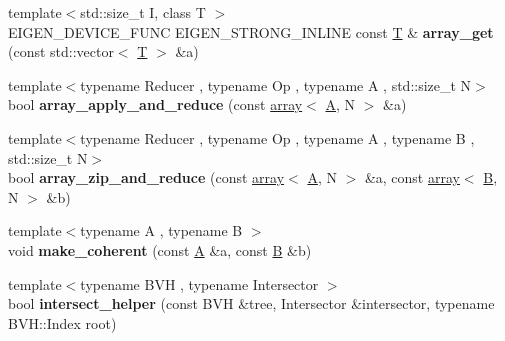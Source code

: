 \begin{DoxyCompactItemize}
\item 
\mbox{\label{namespace_eigen_1_1internal_a3e49b17b66fa573ff6b9d9855f22a997}} 
{\footnotesize template$<$std\+::size\+\_\+t I, class T $>$ }\\E\+I\+G\+E\+N\+\_\+\+D\+E\+V\+I\+C\+E\+\_\+\+F\+U\+NC E\+I\+G\+E\+N\+\_\+\+S\+T\+R\+O\+N\+G\+\_\+\+I\+N\+L\+I\+NE const \hyperlink{group___sparse_core___module}{T} \& {\bfseries array\+\_\+get} (const std\+::vector$<$ \hyperlink{group___sparse_core___module}{T} $>$ \&a)
\item 
\mbox{\label{namespace_eigen_1_1internal_a78ca9587e39563e2c3b9d7c114e471fa}} 
{\footnotesize template$<$typename Reducer , typename Op , typename A , std\+::size\+\_\+t N$>$ }\\bool {\bfseries array\+\_\+apply\+\_\+and\+\_\+reduce} (const \hyperlink{class_eigen_1_1array}{array}$<$ \hyperlink{group___core___module_class_eigen_1_1_matrix}{A}, N $>$ \&a)
\item 
\mbox{\label{namespace_eigen_1_1internal_a279cda04d38e51de5ca7933d83c93abf}} 
{\footnotesize template$<$typename Reducer , typename Op , typename A , typename B , std\+::size\+\_\+t N$>$ }\\bool {\bfseries array\+\_\+zip\+\_\+and\+\_\+reduce} (const \hyperlink{class_eigen_1_1array}{array}$<$ \hyperlink{group___core___module_class_eigen_1_1_matrix}{A}, N $>$ \&a, const \hyperlink{class_eigen_1_1array}{array}$<$ \hyperlink{group___core___module_class_eigen_1_1_matrix}{B}, N $>$ \&b)
\item 
\mbox{\label{namespace_eigen_1_1internal_ab388be0e6798d521da02cb9dd5ab9f5f}} 
{\footnotesize template$<$typename A , typename B $>$ }\\void {\bfseries make\+\_\+coherent} (const \hyperlink{group___core___module_class_eigen_1_1_matrix}{A} \&a, const \hyperlink{group___core___module_class_eigen_1_1_matrix}{B} \&b)
\item 
\mbox{\label{namespace_eigen_1_1internal_abd0f90e57a403bc37861a3b8ab8baa48}} 
{\footnotesize template$<$typename B\+VH , typename Intersector $>$ }\\bool {\bfseries intersect\+\_\+helper} (const B\+VH \&tree, Intersector \&intersector, typename B\+V\+H\+::\+Index root)

\end{DoxyCompactItemize}
